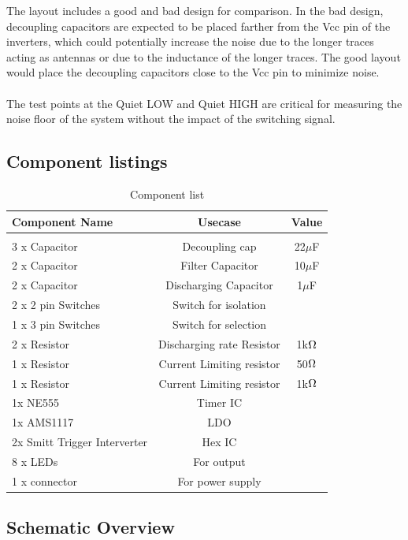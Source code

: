 \documentclass[a4paper,11pt]{article}%
\begin{document}
The layout includes a good and bad design for comparison. In the bad design, decoupling capacitors are expected to be placed farther from the Vcc pin of the inverters, which could potentially increase the noise due to the longer traces acting as antennas or due to the inductance of the longer traces. The good layout would place the decoupling capacitors close to the Vcc pin to minimize noise.\\\\

The test points at the Quiet LOW and Quiet HIGH are critical for measuring the noise floor of the system without the impact of the switching signal.

\subsection{Component listings}
\begin{table}[H]
	\centering 
	\begin{tabular}{l c  c }
		\hline
		\textbf{Component Name}&\textbf{Usecase}&\textbf{Value}\\\hline
		&&\\

3 x Capacitor&Decoupling cap&22$\mu$F\\
2 x Capacitor&Filter Capacitor&10$\mu$F\\
2 x Capacitor&Discharging Capacitor&1$\mu$F\\
2 x 2 pin Switches&Switch for isolation&\\
1 x 3 pin Switches&Switch for selection&\\
2 x Resistor&Discharging rate Resistor&1k$\ohm$\\
1 x Resistor&Current Limiting resistor&50$\ohm$\\
1 x Resistor&Current Limiting resistor&1k$\ohm$\\
1x NE555&Timer IC&\\
1x AMS1117&LDO&\\
2x Smitt Trigger Interverter&Hex IC&\\
8 x LEDs&For output&\\
1 x connector&For power supply&\\
\hline\hline
	\end{tabular}
	\caption{Component list}
	\label{filterspecs}
\end{table}



\subsection{Schematic Overview}
\end{document}
